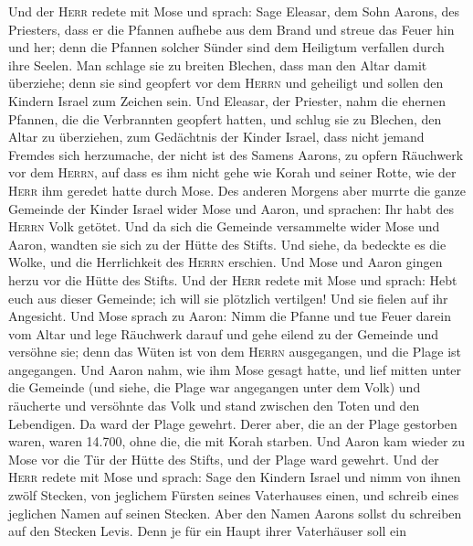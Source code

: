  Und der \textsc{Herr} redete mit Mose und sprach:
 Sage Eleasar, dem Sohn Aarons, des Priesters, dass er die
Pfannen aufhebe aus dem Brand und streue das Feuer hin und her;
 denn die Pfannen solcher Sünder sind dem Heiligtum
verfallen durch ihre Seelen. Man schlage sie zu breiten Blechen, dass
man den Altar damit überziehe; denn sie sind geopfert vor dem
\textsc{Herrn} und geheiligt und sollen den Kindern Israel zum Zeichen
sein.  Und Eleasar, der Priester, nahm die ehernen
Pfannen, die die Verbrannten geopfert hatten, und schlug sie zu Blechen,
den Altar zu überziehen,  zum Gedächtnis der Kinder
Israel, dass nicht jemand Fremdes sich herzumache, der nicht ist des
Samens Aarons, zu opfern Räuchwerk vor dem \textsc{Herrn}, auf dass es
ihm nicht gehe wie Korah und seiner Rotte, wie der \textsc{Herr} ihm
geredet hatte durch Mose.  Des anderen Morgens aber murrte
die ganze Gemeinde der Kinder Israel wider Mose und Aaron, und sprachen:
Ihr habt des \textsc{Herrn} Volk getötet.  Und da sich die
Gemeinde versammelte wider Mose und Aaron, wandten sie sich zu der Hütte
des Stifts. Und siehe, da bedeckte es die Wolke, und die Herrlichkeit
des \textsc{Herrn} erschien.  Und Mose und Aaron gingen
herzu vor die Hütte des Stifts.  Und der \textsc{Herr}
redete mit Mose und sprach:  Hebt euch aus dieser
Gemeinde; ich will sie plötzlich vertilgen! Und sie fielen auf ihr
Angesicht.  Und Mose sprach zu Aaron: Nimm die Pfanne und
tue Feuer darein vom Altar und lege Räuchwerk darauf und gehe eilend zu
der Gemeinde und versöhne sie; denn das Wüten ist von dem \textsc{Herrn}
ausgegangen, und die Plage ist angegangen.  Und Aaron
nahm, wie ihm Mose gesagt hatte, und lief mitten unter die Gemeinde (und
siehe, die Plage war angegangen unter dem Volk) und räucherte und
versöhnte das Volk  und stand zwischen den Toten und den
Lebendigen. Da ward der Plage gewehrt.  Derer aber, die
an der Plage gestorben waren, waren 14.700, ohne die, die mit Korah
starben.  Und Aaron kam wieder zu Mose vor die Tür der
Hütte des Stifts, und der Plage ward gewehrt.  Und der
\textsc{Herr} redete mit Mose und sprach:  Sage den
Kindern Israel und nimm von ihnen zwölf Stecken, von jeglichem Fürsten
seines Vaterhauses einen, und schreib eines jeglichen Namen auf seinen
Stecken.  Aber den Namen Aarons sollst du schreiben auf
den Stecken Levis. Denn je für ein Haupt ihrer Vaterhäuser soll ein
